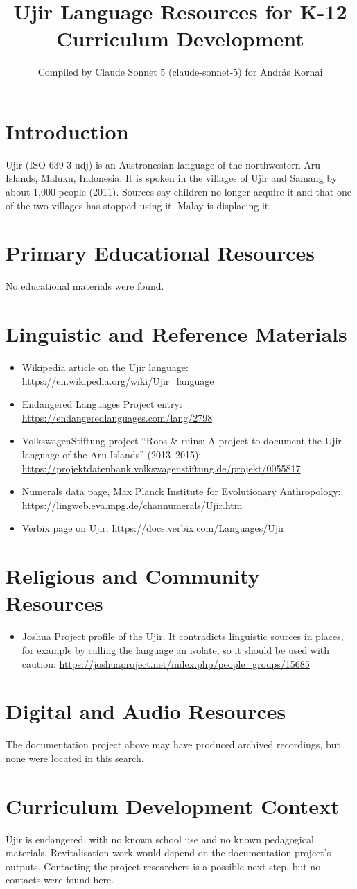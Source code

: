 \documentclass[12pt]{article}
\title{Ujir Language Resources for K-12 Curriculum Development}
\author{Compiled by Claude Sonnet 5 (claude-sonnet-5) for Andr\'as Kornai}
\date{}
\begin{document}
\maketitle
\section{Introduction}
Ujir (ISO 639-3 udj) is an Austronesian language of the northwestern Aru Islands, Maluku, Indonesia. It is spoken in the villages of Ujir and Samang by about 1,000 people (2011). Sources say children no longer acquire it and that one of the two villages has stopped using it. Malay is displacing it.
\section{Primary Educational Resources}
No educational materials were found.
\section{Linguistic and Reference Materials}
\begin{itemize}
\item Wikipedia article on the Ujir language: \url{https://en.wikipedia.org/wiki/Ujir_language}
\item Endangered Languages Project entry: \url{https://endangeredlanguages.com/lang/2798}
\item VolkswagenStiftung project ``Roos \& ruins: A project to document the Ujir language of the Aru Islands'' (2013--2015): \url{https://projektdatenbank.volkswagenstiftung.de/projekt/0055817}
\item Numerals data page, Max Planck Institute for Evolutionary Anthropology: \url{https://lingweb.eva.mpg.de/channumerals/Ujir.htm}
\item Verbix page on Ujir: \url{https://docs.verbix.com/Languages/Ujir}
\end{itemize}
\section{Religious and Community Resources}
\begin{itemize}
\item Joshua Project profile of the Ujir. It contradicts linguistic sources in places, for example by calling the language an isolate, so it should be used with caution: \url{https://joshuaproject.net/index.php/people_groups/15685}
\end{itemize}
\section{Digital and Audio Resources}
The documentation project above may have produced archived recordings, but none were located in this search.
\section{Curriculum Development Context}
Ujir is endangered, with no known school use and no known pedagogical materials. Revitalisation work would depend on the documentation project's outputs. Contacting the project researchers is a possible next step, but no contacts were found here.
\end{document}
